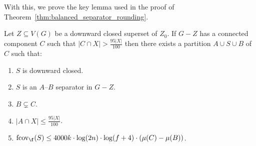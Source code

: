 With this, we prove the key lemma used in the proof of Theorem~\ref{thm:balanced_separator_rounding}.


\begin{lemma}\label{lem:cutoff_procedure}
     Let $Z\subseteq V(G)$ be a downward closed superset of $Z_0$. If $G-Z$ has a connected component $C$ such that $|C\cap X| > \frac{95|X|}{100}$ then there exists a partition $A\cup S\cup B$ of $C$ such that:
    \begin{enumerate}
        \item $S$ is downward closed.
        \item $S$ is an $A$--$B$ separator in $G-Z$.
        \item $B \subsetneq C$.
        \item $|A \cap X| \leq \frac{95|X|}{100}$.
        \item $\mathrm{fcov}_{\f}(S) \leq 4000k \cdot \log(2n) \cdot \log (f + 4) \cdot (\mu(C) - \mu(B))$.
    \end{enumerate}
\end{lemma}

